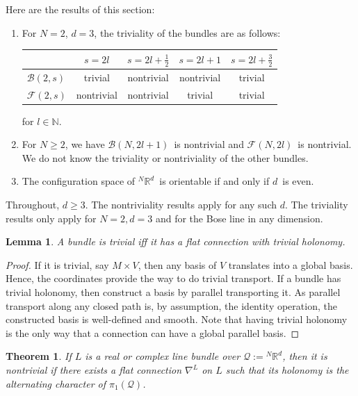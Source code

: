 \documentclass[11pt]{article}
\newtheorem{theorem}{Theorem}
\newtheorem{lemma}{Lemma}
\theoremstyle{remark}
\begin{document}
Here are the results of this section: 
\begin{enumerate} 
\item For $N =2$, $\ensuremath{d} =3$,  the triviality of the bundles are as follows:  

\begin{tabular}{|l|c|c|c|c|}
\hline
& $s=2l$  &  $s=2l+\frac{1}{2}$ &  $s=2l+1$ &  $s=2l+\frac{3}{2}$\\
\hline
$\ensuremath{\mathcal{B}(2,s)}$ & trivial & nontrivial & nontrivial & trivial \\
$\ensuremath{\ensuremath{\mathcal{F}}(2,s)} $ & nontrivial & nontrivial & trivial & trivial\\
\hline
\end{tabular}
for $l \in \mathbb{N}$. 
\item For $N \geq 2$, we have \ensuremath{\mathcal{B}(N, 2l+1)}\ is nontrivial and
\ensuremath{\ensuremath{\mathcal{F}}(N, 2l)}\ is nontrivial. We do not know the 
triviality or nontriviality of the other bundles.  
\item The configuration space of \ensuremath{{}^N\ensuremath{\mathbb{R}^{\ensuremath{d}}}}\ is orientable if and only if
\ensuremath{d}\ is even. 
\end{enumerate}


Throughout, $\ensuremath{d} \geq 3$. The nontriviality results apply for any
such \ensuremath{d}. The triviality results only apply for $N=2, \ensuremath{d}=3$ and for
the Bose line in any dimension. 


\begin{lemma}
A bundle is trivial iff it has a flat connection with trivial
holonomy. 
\end{lemma}

\begin{proof}
If it is trivial, say $M \times V$, then any basis of $V$ translates
into a global basis. Hence, the coordinates provide the way to do 
trivial transport. If a bundle has trivial holonomy, then
construct a basis by parallel transporting it. As parallel transport
along any closed path is, by assumption, the identity operation, the
constructed basis is well-defined and smooth. Note that having trivial
holonomy is the only way that a connection can  have a global parallel basis. 
\end{proof}


\begin{theorem}
If $L$ is a real or complex line bundle over $\ensuremath{\mathcal{Q}} \ensuremath{:=} \ensuremath{{}^N\ensuremath{\mathbb{R}^{\ensuremath{d}}}}$, then it is
nontrivial if there exists a flat connection $\nabla^L$ on $L$ 
such that its
holonomy is the alternating character of \ensuremath{\pi_1 ({\ensuremath{\mathcal{Q}}})}.
\end{theorem} 
\end{document}
